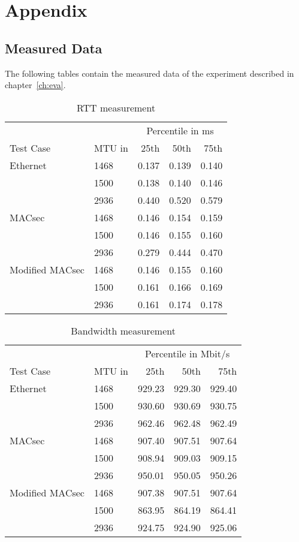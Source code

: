 \chapter{Appendix}
\section{Measured Data}
The following tables contain the measured data of the experiment described in chapter~\ref{ch:eva}.
\begin{table}[h]
  \centering
  \begin{tabular}{llrrr}
    \toprule
    & & \multicolumn{3}{c}{Percentile in ms} \\ \cmidrule(r){3-5}
    Test Case & MTU in & 25th & 50th & 75th\\
    \midrule
    Ethernet & 1468 &0.137 &0.139 & 0.140 \\
    & 1500 & 0.138 & 0.140 & 0.146 \\
    & 2936 & 0.440 & 0.520 & 0.579 \\
    MACsec & 1468 &0.146 & 0.154 & 0.159 \\
     & 1500 & 0.146 & 0.155 & 0.160 \\
     & 2936 & 0.279 & 0.444 & 0.470 \\
    Modified MACsec & 1468 & 0.146 & 0.155 & 0.160 \\
     & 1500 & 0.161 & 0.166 & 0.169 \\
     & 2936 & 0.161 & 0.174 & 0.178 \\
     \bottomrule
  \end{tabular}
  \caption{\acrlong{RTT} measurement}
  \label{tab:rtt-data}
\end{table}
\begin{table}[h]
  \centering
  \begin{tabular}{llrrr}
    \toprule
    & & \multicolumn{3}{c}{Percentile in Mbit/s} \\ \cmidrule(r){3-5}
    Test Case & MTU in& 25th & 50th & 75th\\
    \midrule
   Ethernet & 1468 & 929.23 & 929.30 & 929.40\\
& 1500 & 930.60 & 930.69 & 930.75\\
& 2936 & 962.46 & 962.48 & 962.49\\
MACsec & 1468 & 907.40 & 907.51 & 907.64\\
& 1500 & 908.94 & 909.03 & 909.15\\
& 2936 & 950.01 & 950.05 & 950.26\\
Modified MACsec & 1468 & 907.38 & 907.51 & 907.64\\
& 1500 & 863.95 & 864.19 & 864.41\\
& 2936 & 924.75 & 924.90 & 925.06\\
\bottomrule
  \end{tabular}
  \caption{Bandwidth measurement}
  \label{tab:bandwidth-data}
\end{table}
